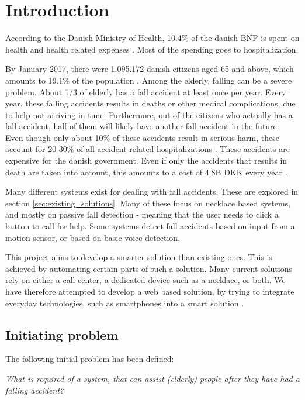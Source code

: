 \chapter*{Introduction}
According to the Danish Ministry of Health, 10.4\% of the danish BNP is spent on health and health related expenses \cite{sum:sundhedsudgifter}. Most of the spending goes to hospitalization.

By January 2017, there were 1.095.172 danish citizens aged 65 and above, which amounts to 19.1\% of the population \cite{aeldrepdf}. Among the elderly, falling can be a severe problem. About 1/3 of elderly has a fall accident at least once per year. Every year, these falling accidents results in deaths or other medical complications, due to help not arriving in time. Furthermore, out of the citizens who actually has a fall accident, half of them will likely have another fall accident in the future.\\
Even though only about 10\% of these accidents result in serious harm, these account for 20-30\% of all accident related hospitalizations \cite{SundhedFald}. These accidents are expensive for the danish government. Even if only the accidents that results in death are taken into account, this amounts to a cost of 4.8B DKK every year \cite{faldkost}.

Many different systems exist for dealing with fall accidents. These are explored in section \ref{sec:existing_solutions}. Many of these focus on necklace based systems, and mostly on passive fall detection - meaning that the user needs to click a button to call for help. Some systems detect fall accidents based on input from a motion sensor, or based on basic voice detection.

This project aims to develop a smarter solution than existing ones. This is achieved by automating certain parts of such a solution. Many current solutions rely on either a call center, a dedicated device such as a necklace, or both. We have therefore attempted to develop a web based solution, by trying to integrate everyday technologies, such as smartphones into a smart solution \cite{smartgrow}.


\section*{Initiating problem}
The following initial problem has been defined:

\begin{center}
    \textit{What is required of a system, that can assist (elderly) people after they have had a falling accident?}
\end{center}

